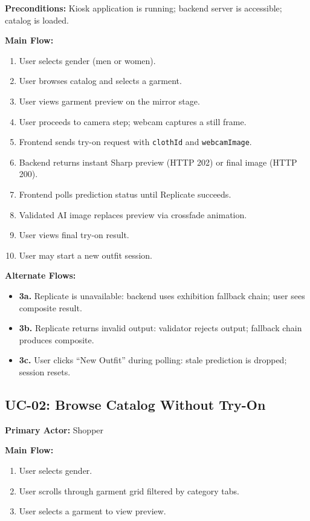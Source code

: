\textbf{Preconditions:} Kiosk application is running; backend server is accessible; catalog is loaded.

\textbf{Main Flow:}
\begin{enumerate}[leftmargin=*]
  \item User selects gender (men or women).
  \item User browses catalog and selects a garment.
  \item User views garment preview on the mirror stage.
  \item User proceeds to camera step; webcam captures a still frame.
  \item Frontend sends try-on request with \texttt{clothId} and \texttt{webcamImage}.
  \item Backend returns instant Sharp preview (HTTP 202) or final image (HTTP 200).
  \item Frontend polls prediction status until Replicate succeeds.
  \item Validated AI image replaces preview via crossfade animation.
  \item User views final try-on result.
  \item User may start a new outfit session.
\end{enumerate}

\textbf{Alternate Flows:}
\begin{itemize}[leftmargin=*]
  \item \textbf{3a.} Replicate is unavailable: backend uses exhibition fallback chain; user sees composite result.
  \item \textbf{3b.} Replicate returns invalid output: validator rejects output; fallback chain produces composite.
  \item \textbf{3c.} User clicks ``New Outfit'' during polling: stale prediction is dropped; session resets.
\end{itemize}

\subsection{UC-02: Browse Catalog Without Try-On}

\textbf{Primary Actor:} Shopper

\textbf{Main Flow:}
\begin{enumerate}[leftmargin=*]
  \item User selects gender.
  \item User scrolls through garment grid filtered by category tabs.
  \item User selects a garment to view preview.
\end{enumerate}


